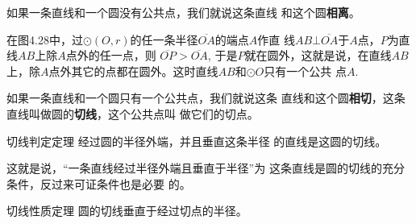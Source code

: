 如果一条直线和一个圆没有公共点，我们就说这条直线
和这个圆\textbf{相离}。

\begin{figure}[htp]\centering
    \begin{minipage}[t]{0.48\textwidth}
    \centering
    \caption{}
    \end{minipage}
    \begin{minipage}[t]{0.48\textwidth}
    \centering
    \caption{}
    \end{minipage}
    \end{figure}

在图4.28中，过$\odot (O,r)$的任一条半径$\overline{OA}$的端点$A$作直
线$AB\bot \overline{OA}$于$A$点，$P$为直线$AB$上除$A$点外的任一点，则
$\overline{OP}>\overline{OA}$, 于是$P$就在圆外，这就是说，在直线$AB$上，除$A$点外其它的点都在圆外。这时直线$AB$和$\odot O$只有一个公共
点$A$.

如果一条直线和一个圆只有一个公共点，我们就说这条
直线和这个圆\textbf{相切}，这条直线叫做圆的\textbf{切线}，这个公共点叫
做它们的切点。

\begin{blk}
    {切线判定定理} 经过圆的半径外端，并且垂直这条半径
的直线是这圆的切线。
\end{blk}

这就是说，“一条直线经过半径外端且垂直于半径”为
这条直线是圆的切线的充分条件，反过来可证条件也是必要
的。

\begin{blk}
    {切线性质定理} 圆的切线垂直于经过切点的半径。
\end{blk}

